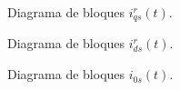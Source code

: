 \documentclass[a4paper, 10pt, onecolumn,journal]{ieeeconf}
\begin{document}
\begin{figure}[H]
    \centering
    \begin{adjustbox}{scale=0.7,max width=\columnwidth}
    \end{adjustbox}
    \caption{Diagrama de bloques $i^r_{qs}(t)$.}
    \label{diagrama de bloques I_qs}
\end{figure}

\begin{figure}[H]
    \centering
    \begin{adjustbox}{max width=\columnwidth}
    \end{adjustbox}
    \caption{Diagrama de bloques $i^r_{ds}(t)$.}
    \label{diagrama de bloques I_ds}
\end{figure}

\begin{figure}[H]
    \centering
    \begin{adjustbox}{max width=\columnwidth}
    \end{adjustbox}
    \caption{Diagrama de bloques $i_{0s}(t)$.}
    \label{diagrama de bloques I_0s}
\end{figure}
\end{document}

